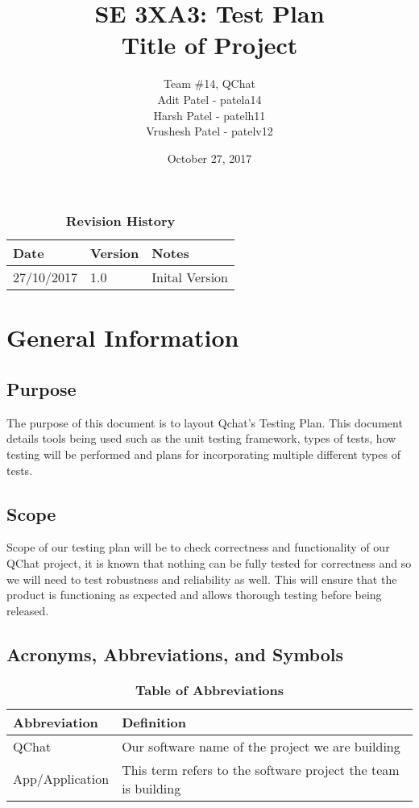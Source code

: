 \documentclass[12pt, titlepage]{article}
\title{SE 3XA3: Test Plan\\Title of Project} %
\author{Team \#14, QChat
		\\ Adit Patel - patela14
		\\ Harsh Patel - patelh11
		\\ Vrushesh Patel - patelv12
}
\date{October 27, 2017}
\begin{document}
\maketitle

\tableofcontents
\listoftables
\listoffigures


\begin{table}[bp]
\caption{\bf Revision History}
\begin{tabularx}{\textwidth}{p{3cm}p{2cm}X}
\toprule {\bf Date} & {\bf Version} & {\bf Notes}\\
\midrule
27/10/2017 & 1.0 & Inital Version\\
\bottomrule
\end{tabularx}
\end{table}


\newpage


\section{General Information}

\subsection{Purpose}
The purpose of this document is to layout Qchat’s Testing Plan. This document details tools being used such as the unit testing framework, types of tests, how testing will be performed and plans for incorporating multiple different types of tests. 

\subsection{Scope}
Scope of our testing plan will be to check correctness and functionality of our QChat project, it is known that nothing can be fully tested for correctness and so we will need to test robustness and reliability as well. This will ensure that the product is functioning as expected and allows thorough testing before being released. 

\subsection{Acronyms, Abbreviations, and Symbols}
	
\begin{table}[hbp]
\caption{\textbf{Table of Abbreviations}} \label{Table}

\begin{tabularx}{\textwidth}{p{3cm}X}
\toprule
\textbf{Abbreviation} & \textbf{Definition} \\
\midrule
QChat & Our software name of the project we are building\\
App/Application & This term refers to the software project the team is building\\
\bottomrule
\end{tabularx}

\end{table}
\end{document}

